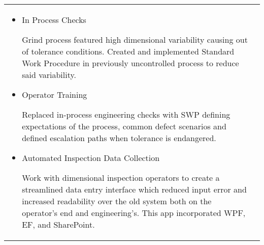 \documentclass[a4paper, oneside, final, 10pt]{scrartcl} %
\begin{document}
\begin{center}
\begin{tabularx}{0.97\linewidth}{X|X}
\begin{itemize}
        \item{In Process Checks}
        \begin{sloppypar}
            Grind process featured high dimensional variability causing out of tolerance conditions.
            Created and implemented Standard Work Procedure in previously uncontrolled process to reduce said variability.
        \end{sloppypar}
        \item{Operator Training}
        \begin{sloppypar}
            Replaced in-process engineering checks with SWP defining expectations of the process, common defect scenarios
            and defined escalation paths when tolerance is endangered.
        \end{sloppypar}
        \item {Automated Inspection Data Collection}
        \begin{sloppypar}
            Work with dimensional inspection operators to create a streamlined data entry interface which reduced
            input error and increased readability over the old system both on the operator's end and engineering's. This
            app incorporated WPF, EF, and SharePoint.
        \end{sloppypar}
    \end{itemize}
\end{tabularx}





\end{center}
\end{document}
